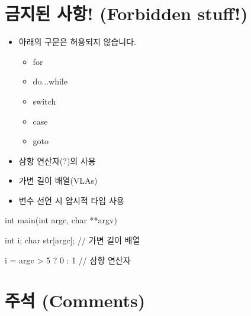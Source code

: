 \documentclass{42-ko}
\begin{document}
    \section{금지된 사항! (Forbidden stuff!)}

        \begin{itemize}

            \item 아래의 구문은 허용되지 않습니다.

                \begin{itemize}

                    \item for
                    \item do...while
                    \item switch
                    \item case
                    \item goto

                \end{itemize}

            \item 삼항 연산자(?)의 사용

            \item 가변 길이 배열(VLAs)

            \item 변수 선언 시 암시적 타입 사용

        \end{itemize}

\vspace{1cm}

        \begin{42ccode}
    int main(int argc, char **argv)
    {
        int     i;
        char    str[argc]; // 가변 길이 배열

        i = argc > 5 ? 0 : 1 // 삼항 연산자
    }
        \end{42ccode}
        \newpage

    \section{주석 (Comments)}
\end{document}
